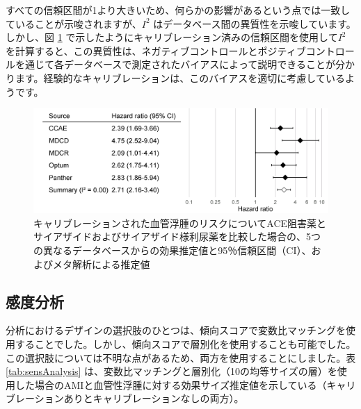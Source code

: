 \documentclass[
  11pt]{book}
\theoremstyle{definition}
\theoremstyle{definition}
\theoremstyle{definition}
\theoremstyle{definition}
\theoremstyle{remark}
\begin{document}
すべての信頼区間が1より大きいため、何らかの影響があるという点では一致していることが示唆されますが、\(I^2\) はデータベース間の異質性を示唆しています。しかし、図 \ref{fig:forestCal} で示したようにキャリブレーション済みの信頼区間を使用して\(I^2\) を計算すると、この異質性は、ネガティブコントロールとポジティブコントロールを通じて各データベースで測定されたバイアスによって説明できることが分かります。経験的なキャリブレーションは、このバイアスを適切に考慮しているようです。

\begin{figure}

{\centering \includegraphics[width=0.9\linewidth]{images/MethodValidity/forestCal} 

}

\caption{キャリブレーションされた血管浮腫のリスクについてACE阻害薬とサイアザイドおよびサイアザイド様利尿薬を比較した場合の、5つの異なるデータベースからの効果推定値と95％信頼区間（CI）、およびメタ解析による推定値}\label{fig:forestCal}
\end{figure}

\subsection{感度分析}\label{ux611fux5ea6ux5206ux6790-1}

分析におけるデザインの選択肢のひとつは、傾向スコアで変数比マッチングを使用することでした。しかし、傾向スコアで層別化を使用することも可能でした。この選択肢については不明な点があるため、両方を使用することにしました。表 \ref{tab:sensAnalysis} は、変数比マッチングと層別化（10の均等サイズの層）を使用した場合のAMIと血管性浮腫に対する効果サイズ推定値を示している（キャリブレーションありとキャリブレーションなしの両方）。
\end{document}
